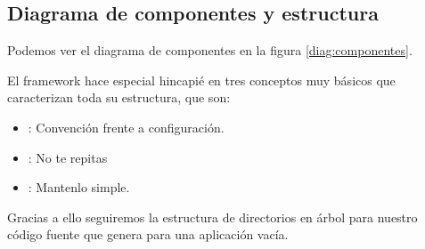 \subsection{Diagrama de componentes y estructura}

Podemos ver el diagrama de componentes en la figura \ref{diag:componentes}.


El framework  hace especial hincapié en tres conceptos
muy básicos que caracterizan toda su estructura, que son:

\begin{itemize}
\item {}: Convención frente a
  configuración.
\item {}: No te repitas
\item {}: Mantenlo simple.
\end{itemize}

Gracias a ello seguiremos la estructura de directorios en árbol para nuestro
código fuente que genera  para una aplicación vacía.

